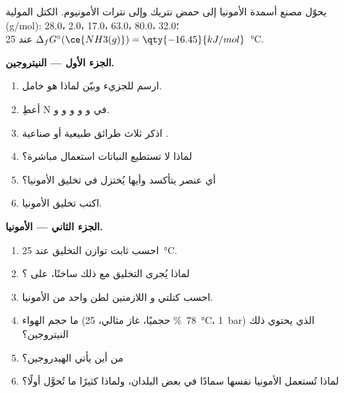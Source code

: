 \begin{problem}
\label{pb:b1:p-block-13-15:1}
يحوّل مصنع أسمدة الأمونيا إلى حمض نتريك وإلى نترات
الأمونيوم. الكتل المولية (\unit{g/mol}):  28.0،  2.0، 
17.0،  63.0،  80.0،  32.0؛
$\Delta_f G^\circ(\ce{NH3(g)}) = \qty{-16.45}{kJ/mol}$ عند
\qty{25}{\celsius}.

\medskip
\noindent\textbf{الجزء الأول --- النيتروجين.}
\begin{enumerate}
  \item ارسم  للجزيء  وبيّن لماذا هو خامل.
  \item أعطِ  N في  و و
        و و و.
  \item اذكر ثلاث طرائق طبيعية أو صناعية .
  \item لماذا لا تستطيع النباتات استعمال  مباشرة؟
  \item أي عنصر يتأكسد وأيها يُختزل في تخليق
        الأمونيا؟
  \item اكتب تخليق الأمونيا.
\end{enumerate}

\medskip
\noindent\textbf{الجزء الثاني --- الأمونيا.}
\begin{enumerate}[resume]
  \item احسب ثابت توازن التخليق عند
        \qty{25}{\celsius}.
  \item لماذا يُجرى التخليق مع ذلك ساخنًا، على ؟
  \item احسب كتلتي  و اللازمتين لطن واحد من
        الأمونيا.
  \item ما حجم الهواء (\qty{78}{\percent}  حجميًا، غاز
        مثالي، \qty{25}{\celsius}، \qty{1}{bar}) الذي يحتوي ذلك النيتروجين؟
  \item من أين يأتي الهيدروجين؟
  \item لماذا تُستعمل الأمونيا نفسها سمادًا في بعض البلدان،
        ولماذا كثيرًا ما تُحوَّل أولًا؟
\end{enumerate}


\end{problem}

